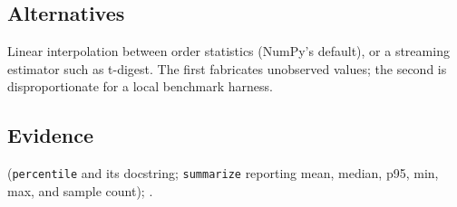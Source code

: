 \subsection*{Alternatives}

Linear interpolation between order statistics (NumPy's default), or a
streaming estimator such as t-digest. The first fabricates unobserved values;
the second is disproportionate for a local benchmark harness.

\subsection*{Evidence}

(\texttt{percentile} and its docstring; \texttt{summarize} reporting mean,
median, p95, min, max, and sample count);
.
